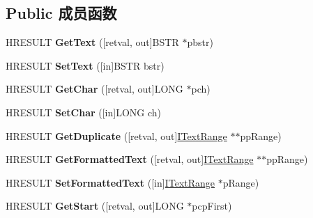 \subsection*{Public 成员函数}
\begin{DoxyCompactItemize}
\item 
\mbox{\label{interface_i_text_range_a225d0861af06656926d6317f06ce6063}} 
H\+R\+E\+S\+U\+LT {\bfseries Get\+Text} (\mbox{[}retval, out\mbox{]}B\+S\+TR $\ast$pbstr)
\item 
\mbox{\label{interface_i_text_range_afad86b92483e93fa7704f0a6bfc94e2c}} 
H\+R\+E\+S\+U\+LT {\bfseries Set\+Text} (\mbox{[}in\mbox{]}B\+S\+TR bstr)
\item 
\mbox{\label{interface_i_text_range_a118c0ad2bc6cbcf1747b2624c5abeffc}} 
H\+R\+E\+S\+U\+LT {\bfseries Get\+Char} (\mbox{[}retval, out\mbox{]}L\+O\+NG $\ast$pch)
\item 
\mbox{\label{interface_i_text_range_a0c53be2628a7716946da4d1fc0dbd546}} 
H\+R\+E\+S\+U\+LT {\bfseries Set\+Char} (\mbox{[}in\mbox{]}L\+O\+NG ch)
\item 
\mbox{\label{interface_i_text_range_a43bcc12a2bebc51afb549039a0a54e3e}} 
H\+R\+E\+S\+U\+LT {\bfseries Get\+Duplicate} (\mbox{[}retval, out\mbox{]}\hyperlink{interface_i_text_range}{I\+Text\+Range} $\ast$$\ast$pp\+Range)
\item 
\mbox{\label{interface_i_text_range_a3018da014d34d137d6609a61f237c842}} 
H\+R\+E\+S\+U\+LT {\bfseries Get\+Formatted\+Text} (\mbox{[}retval, out\mbox{]}\hyperlink{interface_i_text_range}{I\+Text\+Range} $\ast$$\ast$pp\+Range)
\item 
\mbox{\label{interface_i_text_range_a52442b4c6cd78e796aceef71422818d7}} 
H\+R\+E\+S\+U\+LT {\bfseries Set\+Formatted\+Text} (\mbox{[}in\mbox{]}\hyperlink{interface_i_text_range}{I\+Text\+Range} $\ast$p\+Range)
\item 
\mbox{\label{interface_i_text_range_a820ad0ff0e2602e802ed9cc51016371e}} 
H\+R\+E\+S\+U\+LT {\bfseries Get\+Start} (\mbox{[}retval, out\mbox{]}L\+O\+NG $\ast$pcp\+First)

\end{DoxyCompactItemize}

